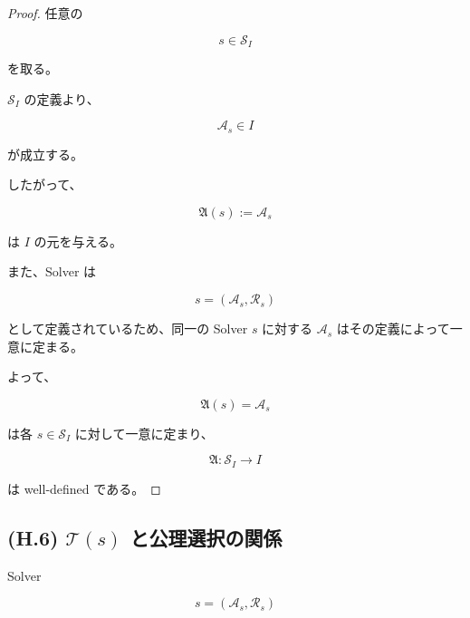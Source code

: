 \documentclass[a4paper,11pt]{article}
\begin{document}
\begin{proof}

任意の

\begin{equation}
    s\in\mathcal{S}_I
\end{equation}

を取る。

$\mathcal{S}_I$ の定義より、

\begin{equation}
    \mathcal{A}_s\in I
\end{equation}

が成立する。

したがって、

\begin{equation}
    \mathfrak{A}(s)
    :=
    \mathcal{A}_s
\end{equation}

は $I$ の元を与える。

また、Solver は

\begin{equation}
    s=(\mathcal{A}_s,\mathcal{R}_s)
\end{equation}

として定義されているため、同一の Solver $s$ に対する
$\mathcal{A}_s$ はその定義によって一意に定まる。

よって、

\begin{equation}
    \mathfrak{A}(s)=\mathcal{A}_s
\end{equation}

は各 $s\in\mathcal{S}_I$ に対して一意に定まり、

\begin{equation}
    \mathfrak{A}:
    \mathcal{S}_I\to I
\end{equation}

は well-defined である。

\end{proof}


\subsection{(H.6) $\mathcal{T}(s)$ と公理選択の関係}
\label{subsec:H6}

Solver

\begin{equation}
    s=(\mathcal{A}_s,\mathcal{R}_s)
\end{equation}
\end{document}
